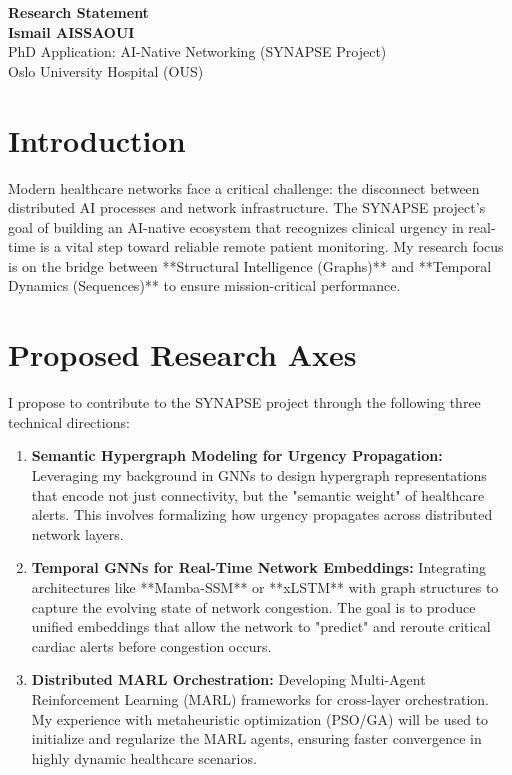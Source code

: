 \documentclass[a4paper,11pt]{article}
\begin{document}
\begin{center}
    {\huge \textbf{Research Statement}} \\
    \bigskip
    {\large \textbf{Ismail AISSAOUI}} \\
    PhD Application: AI-Native Networking (SYNAPSE Project) \\
    Oslo University Hospital (OUS)
\end{center}

\bigskip

\section{Introduction}
Modern healthcare networks face a critical challenge: the disconnect between distributed AI processes and network infrastructure. The SYNAPSE project’s goal of building an AI-native ecosystem that recognizes clinical urgency in real-time is a vital step toward reliable remote patient monitoring. My research focus is on the bridge between **Structural Intelligence (Graphs)** and **Temporal Dynamics (Sequences)** to ensure mission-critical performance.

\section{Proposed Research Axes}
I propose to contribute to the SYNAPSE project through the following three technical directions:

\begin{enumerate}[label=\textbf{Axis \arabic*:}]
    \item \textbf{Semantic Hypergraph Modeling for Urgency Propagation:} Leveraging my background in GNNs to design hypergraph representations that encode not just connectivity, but the "semantic weight" of healthcare alerts. This involves formalizing how urgency propagates across distributed network layers.
    \item \textbf{Temporal GNNs for Real-Time Network Embeddings:} Integrating architectures like **Mamba-SSM** or **xLSTM** with graph structures to capture the evolving state of network congestion. The goal is to produce unified embeddings that allow the network to "predict" and reroute critical cardiac alerts before congestion occurs.
    \item \textbf{Distributed MARL Orchestration:} Developing Multi-Agent Reinforcement Learning (MARL) frameworks for cross-layer orchestration. My experience with metaheuristic optimization (PSO/GA) will be used to initialize and regularize the MARL agents, ensuring faster convergence in highly dynamic healthcare scenarios.
\end{enumerate}
\end{document}
